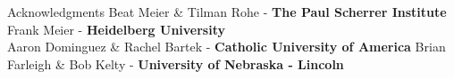 \documentclass[final]{beamer}
\newlength{\onecolwide}
\begin{document}
\begin{frame}[t]
\begin{columns}[t]
\begin{column}{\onecolwide}
    \begin{block}{Acknowledgments} 
      \footnotesize
      Beat Meier \& Tilman Rohe \-- \textbf{The Paul Scherrer Institute}\\
      Frank Meier \-- \textbf{Heidelberg University}\\
      Aaron Dominguez \& Rachel Bartek \-- \textbf{Catholic University of America}
      Brian Farleigh \& Bob Kelty \-- \textbf{University of Nebraska \-- Lincoln}
    \end{block}
  \end{column}
\end{columns}

\end{frame} %
\end{document}
